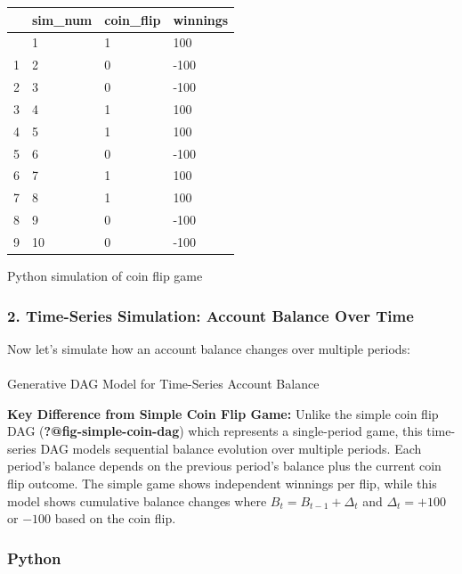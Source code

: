 \documentclass[
  letterpaper,
  DIV=11,
  numbers=noendperiod]{scrartcl}
\makeatletter
\let\oldparagraph\paragraph
\renewcommand{\paragraph}{
    \@ifstar
      \xxxParagraphStar
      \xxxParagraphNoStar
  }
\newcommand{\xxxParagraphStar}[1]{\oldparagraph*{#1}\mbox{}}
\newcommand{\xxxParagraphNoStar}[1]{\oldparagraph{#1}\mbox{}}
\theoremstyle{definition}
\theoremstyle{remark}
\makeatother
\begin{document}
\label{simple-sim-python}
\begin{longtable}[]{@{}llll@{}}
\toprule\noalign{}
& sim\_num & coin\_flip & winnings \\
\midrule\noalign{}
\endhead
\bottomrule\noalign{}
\endlastfoot
0 & 1 & 1 & 100 \\
1 & 2 & 0 & -100 \\
2 & 3 & 0 & -100 \\
3 & 4 & 1 & 100 \\
4 & 5 & 1 & 100 \\
5 & 6 & 0 & -100 \\
6 & 7 & 1 & 100 \\
7 & 8 & 1 & 100 \\
8 & 9 & 0 & -100 \\
9 & 10 & 0 & -100 \\
\end{longtable}

Python simulation of coin flip game

\subsubsection{2. Time-Series Simulation: Account Balance Over
Time}\label{time-series-simulation-account-balance-over-time}

Now let's simulate how an account balance changes over multiple periods:

\paragraph{Generative DAG Model for Time-Series Account
Balance}\label{generative-dag-model-for-time-series-account-balance}

\textbf{Key Difference from Simple Coin Flip Game:} Unlike the simple
coin flip DAG (\textbf{?@fig-simple-coin-dag}) which represents a
single-period game, this time-series DAG models sequential balance
evolution over multiple periods. Each period's balance depends on the
previous period's balance plus the current coin flip outcome. The simple
game shows independent winnings per flip, while this model shows
cumulative balance changes where \(B_t = B_{t-1} + \Delta_t\) and
\(\Delta_t = +100\) or \(-100\) based on the coin flip.

\subsubsection{Python}
\end{document}
